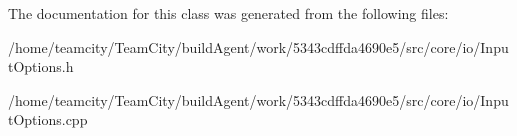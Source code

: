 The documentation for this class was generated from the following files\+:\begin{DoxyCompactItemize}
\item 
/home/teamcity/\+Team\+City/build\+Agent/work/5343cdffda4690e5/src/core/io/Input\+Options.\+h\item 
/home/teamcity/\+Team\+City/build\+Agent/work/5343cdffda4690e5/src/core/io/Input\+Options.\+cpp\end{DoxyCompactItemize}
